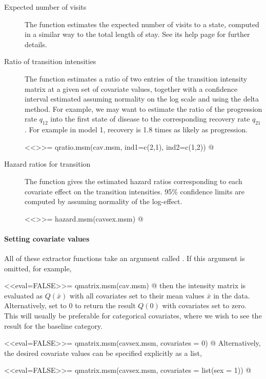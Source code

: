 \begin{description}
\item[Expected number of visits] The function 
  estimates the expected number of visits to a state, computed in a
  similar way to the total length of stay. See its help page for
  further details.

\item[Ratio of transition intensities] The function
   estimates a ratio of two entries of the
  transition intensity matrix at a given set of covariate values,
  together with a confidence interval estimated assuming normality on
  the log scale and using the delta method.  For example, we may want
  to estimate the ratio of the progression rate $q_{12}$ into the
  first state of disease to the corresponding recovery rate $q_{21}$.
  For example in model 1, recovery is 1.8 times as likely as
  progression.

<<>>=
qratio.msm(cav.msm, ind1=c(2,1), ind2=c(1,2))
@

\item[Hazard ratios for transition] The function 
  gives the estimated hazard ratios corresponding to each covariate
  effect on the transition intensities. 95\% confidence limits are
  computed by assuming normality of the log-effect.

<<>>=
hazard.msm(cavsex.msm)
@

\end{description}

\paragraph{Setting covariate values}
All of these extractor functions take an argument called
.  If this argument is omitted, for example,

<<eval=FALSE>>=
qmatrix.msm(cav.msm)
@
then the intensity matrix is evaluated as $Q(\bar x)$ with all
covariates set to their mean values $\bar x$ in the data.
Alternatively, set  to 0 to return the result
$Q(0)$ with covariates set to zero. This will usually be
preferable for categorical covariates, where we wish to see the
result for the baseline category.

<<eval=FALSE>>=
qmatrix.msm(cavsex.msm, covariates = 0)
@
Alternatively, the desired covariate values can be specified
explicitly as a list,

<<eval=FALSE>>=
qmatrix.msm(cavsex.msm, covariates = list(sex = 1))
@

